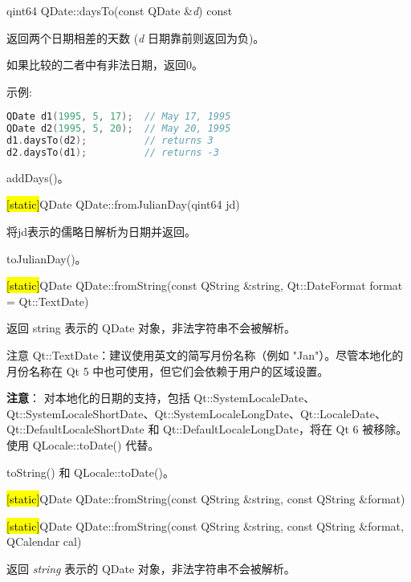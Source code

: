 \splitLine

qint64 QDate::daysTo(const QDate \&\emph{d}) const

返回两个日期相差的天数 (\emph{d} 日期靠前则返回为负)。

如果比较的二者中有非法日期，返回0。

示例:

\begin{lstlisting}[language=C++]
QDate d1(1995, 5, 17);  // May 17, 1995
QDate d2(1995, 5, 20);  // May 20, 1995
d1.daysTo(d2);          // returns 3
d2.daysTo(d1);          // returns -3
\end{lstlisting}


\begin{notice}[另请参阅]
addDays()。
\end{notice}

\splitLine

\hl{[static]}QDate QDate::fromJulianDay(qint64 jd)

将jd表示的儒略日解析为日期并返回。


\begin{notice}[另请参阅]
toJulianDay()。
\end{notice}


\splitLine

\hl{[static]}QDate QDate::fromString(const QString \&string,
Qt::DateFormat format = Qt::TextDate)

返回 string 表示的 QDate 对象，非法字符串不会被解析。

注意 Qt::TextDate：建议使用英文的简写月份名称（例如 "Jan"）。尽管本地化的月份名称在 Qt 5 中也可使用，但它们会依赖于用户的区域设置。

\textbf{注意}： 对本地化的日期的支持，包括 Qt::SystemLocaleDate、Qt::SystemLocaleShortDate、Qt::SystemLocaleLongDate、Qt::LocaleDate、Qt::DefaultLocaleShortDate 和 Qt::DefaultLocaleLongDate，将在 Qt 6 被移除。使用 QLocale::toDate() 代替。


\begin{notice}[另请参阅]
toString() 和 QLocale::toDate()。
\end{notice}

\splitLine

\hl{[static]}QDate QDate::fromString(const QString \&string, const QString
\&format)

\hl{[static]}QDate QDate::fromString(const QString \&string, const QString
\&format, QCalendar cal)

返回 \emph{string}  表示的 QDate 对象，非法字符串不会被解析。

